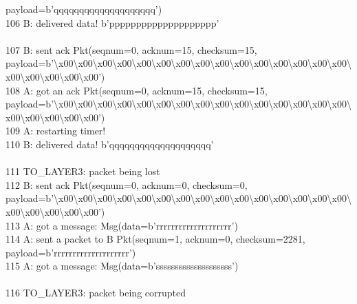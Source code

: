 \documentclass{article}
\begin{document}
{payload=b'qqqqqqqqqqqqqqqqqqqq') \\
106 B: delivered data! b'pppppppppppppppppppp' \\
 \\
107 B: sent ack Pkt(seqnum=0, acknum=15, checksum=15,
payload=b'\textbackslash{}x00\textbackslash{}x00\textbackslash{}x00\textbackslash{}x00\textbackslash{}x00\textbackslash{}x00\textbackslash{}x00\textbackslash{}x00\textbackslash{}x00\textbackslash{}x00\textbackslash{}x00\textbackslash{}x00\textbackslash{}x00\textbackslash{}x00\textbackslash{}x00\textbackslash{}x00\textbackslash{}x00\textbackslash{}x00\textbackslash{}x00\textbackslash{}x00')
\\
108 A: got an ack Pkt(seqnum=0, acknum=15, checksum=15,
payload=b'\textbackslash{}x00\textbackslash{}x00\textbackslash{}x00\textbackslash{}x00\textbackslash{}x00\textbackslash{}x00\textbackslash{}x00\textbackslash{}x00\textbackslash{}x00\textbackslash{}x00\textbackslash{}x00\textbackslash{}x00\textbackslash{}x00\textbackslash{}x00\textbackslash{}x00\textbackslash{}x00\textbackslash{}x00\textbackslash{}x00\textbackslash{}x00\textbackslash{}x00')
\\
109 A: restarting timer! \\
110 B: delivered data! b'qqqqqqqqqqqqqqqqqqqq' \\
 \\
111    \hspace*{10mm}       TO\_LAYER3: packet being lost \\
112 B: sent ack Pkt(seqnum=0, acknum=0, checksum=0,
payload=b'\textbackslash{}x00\textbackslash{}x00\textbackslash{}x00\textbackslash{}x00\textbackslash{}x00\textbackslash{}x00\textbackslash{}x00\textbackslash{}x00\textbackslash{}x00\textbackslash{}x00\textbackslash{}x00\textbackslash{}x00\textbackslash{}x00\textbackslash{}x00\textbackslash{}x00\textbackslash{}x00\textbackslash{}x00\textbackslash{}x00\textbackslash{}x00\textbackslash{}x00')
\\
113 A: got a message: Msg(data=b'rrrrrrrrrrrrrrrrrrrr') \\
114 A: sent a packet to B Pkt(seqnum=1, acknum=0, checksum=2281,
payload=b'rrrrrrrrrrrrrrrrrrrr') \\
115 A: got a message: Msg(data=b'ssssssssssssssssssss') \\
 \\
116     \hspace*{10mm}      TO\_LAYER3: packet being corrupted \\
}
\end{document}
